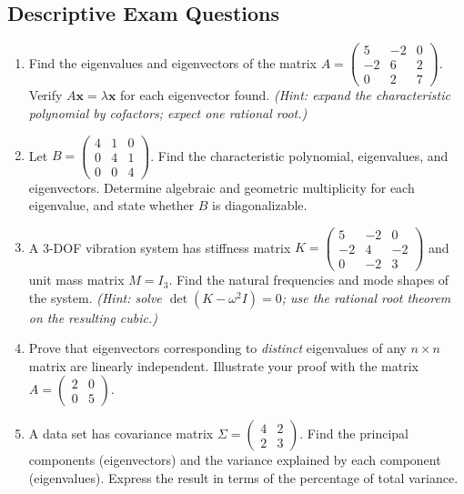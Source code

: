 \documentclass[12pt,a4paper]{article}
\begin{document}
\subsection*{Descriptive Exam Questions}

\begin{enumerate}
  \item Find the eigenvalues and eigenvectors of the matrix
        $A = \begin{pmatrix} 5 & -2 & 0 \\ -2 & 6 & 2 \\ 0 & 2 & 7 \end{pmatrix}$.
        Verify $A\mathbf{x} = \lambda\mathbf{x}$ for each eigenvector found.
        \textit{(Hint: expand the characteristic polynomial by cofactors; expect one rational root.)}

  \item Let $B = \begin{pmatrix} 4 & 1 & 0 \\ 0 & 4 & 1 \\ 0 & 0 & 4 \end{pmatrix}$.
        Find the characteristic polynomial, eigenvalues, and eigenvectors. Determine algebraic and geometric
        multiplicity for each eigenvalue, and state whether $B$ is diagonalizable.

  \item A 3-DOF vibration system has stiffness matrix
        $K = \begin{pmatrix} 5 & -2 & 0 \\ -2 & 4 & -2 \\ 0 & -2 & 3 \end{pmatrix}$ and unit mass matrix $M = I_3$.
        Find the natural frequencies and mode shapes of the system.
        \textit{(Hint: solve $\det(K-\omega^2 I)=0$; use the rational root theorem on the resulting cubic.)}

  \item Prove that eigenvectors corresponding to \emph{distinct} eigenvalues of any $n \times n$ matrix
        are linearly independent. Illustrate your proof with the matrix
        $A = \begin{pmatrix}2&0\\0&5\end{pmatrix}$.

  \item A data set has covariance matrix $\Sigma = \begin{pmatrix}4&2\\2&3\end{pmatrix}$.
        Find the principal components (eigenvectors) and the variance explained by each component (eigenvalues).
        Express the result in terms of the percentage of total variance.
\end{enumerate}
\end{document}
